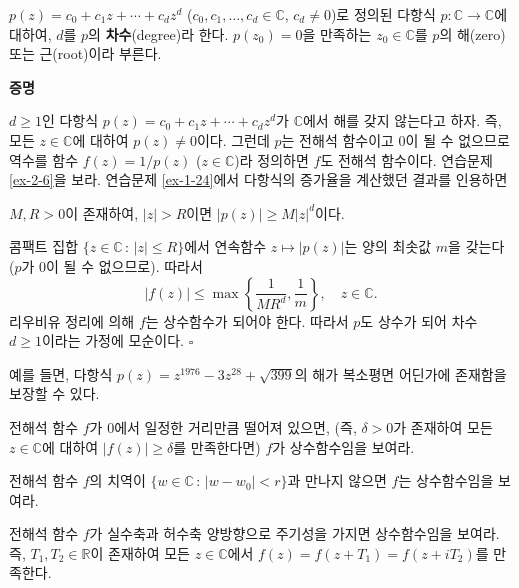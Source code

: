 $p(z) = c_0 + c_1z + \cdots + c_dz^d$ 
($c_0, c_1, \ldots, c_d\in \mathbb C$, $c_d\ne0$)로 정의된
다항식 $p:\mathbb C \to \mathbb C$에 대하여,
$d$를 $p$의 \textbf{차수}(degree)라 한다. 
$p(z_0)=0$을 만족하는 $z_0\in \mathbb C$를 $p$의 해(zero) 또는 근(root)이라 부른다.

{\bf 증명}

$d\ge1$인 다항식 $p(z) = c_0 + c_1z + \cdots + c_dz^d$가
$\mathbb C$에서 해를 갖지 않는다고 하자.
즉, 모든 $z\in\mathbb C$에 대하여 $p(z)\ne0$이다.
그런데 $p$는 전해석 함수이고 $0$이 될 수 없으므로 역수를 
함수 $f(z) = 1/p(z)$ ($z\in\mathbb C$)라 정의하면
$f$도 전해석 함수이다. 연습문제 \ref{ex-2-6}을 보라.
연습문제 \ref{ex-1-24}에서 다항식의 증가율을 계산했던 결과를 인용하면
\begin{center}
$M,R>0$이 존재하여, $|z|>R$이면 $|p(z)|\ge M|z|^d$이다.
\end{center}
콤팩트 집합 $\{z\in\mathbb C\,:\, |z|\le R\}$에서
연속함수 $z\mapsto |p(z)|$는 양의 최솟값 $m$을 갖는다 ($p$가 $0$이 될 수 없으므로).
따라서
\[
|f(z)| \le \max\left\{ \dfrac1{MR^d}, \dfrac1m \right\}, \quad z\in\mathbb C.
\]
리우비유 정리에 의해 $f$는 상수함수가 되어야 한다.
따라서 $p$도 상수가 되어 차수 $d\ge1$이라는 가정에 모순이다.
\hfill $\square$

예를 들면, 다항식 $p(z) = z^{1976} -3z^{28} + \sqrt{399}$의 해가
복소평면 어딘가에 존재함을 보장할 수 있다.

\begin{salt_exercise} \label{ex-3-30}
전해석 함수 $f$가 $0$에서 일정한 거리만큼 떨어져 있으면,
(즉, $\delta>0$가 존재하여 모든 $z\in\mathbb C$에 대하여 $|f(z)|\ge\delta$를 만족한다면)
$f$가 상수함수임을 보여라.
\end{salt_exercise}

\begin{salt_exercise} \label{ex-3-31}
전해석 함수 $f$의 치역이 $\{ w\in\mathbb C\,:\, |w-w_0| < r\}$과 만나지 않으면
$f$는 상수함수임을 보여라.
\end{salt_exercise}

\begin{salt_exercise} \label{ex-3-32}
전해석 함수 $f$가 실수축과 허수축 양방향으로 주기성을 가지면 상수함수임을 보여라.
즉, $T_1, T_2\in \mathbb R$이 존재하여 
모든 $z\in \mathbb C$에서 $f(z) = f(z+T_1) =f(z+iT_2)$를 만족한다.
\end{salt_exercise}


